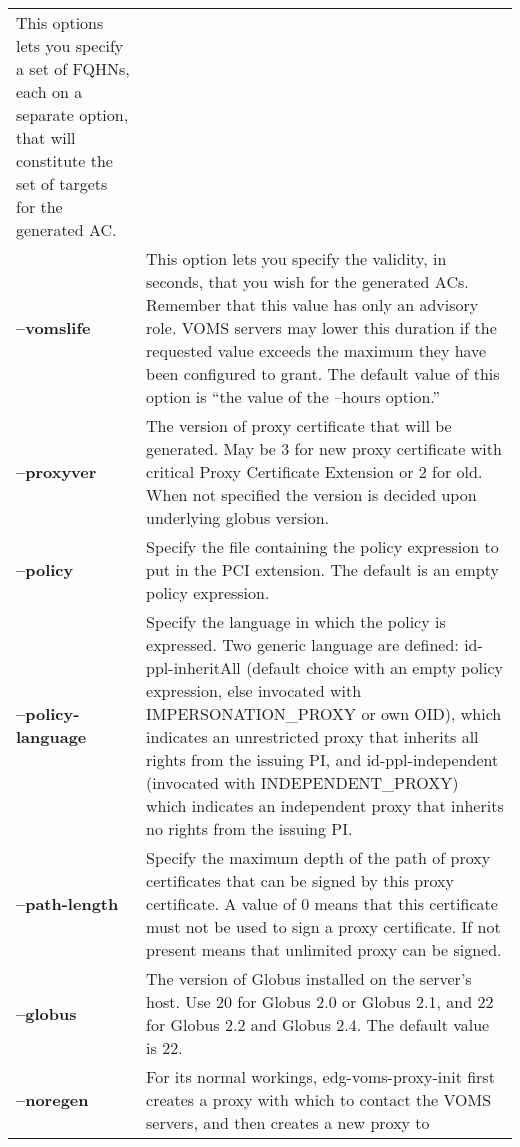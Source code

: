 \documentclass[a4paper]{book}
\begin{document}
\begin{longtable}{lp{3in}}
		      This options lets you specify a set of FQHNs,
		      each on a separate option, that will constitute
		      the set of targets for the generated AC.\\
\textbf{--vomslife} & This option lets you specify the validity, in
		      seconds, that you wish for the generated ACs.
		      Remember that this value has only an advisory
		      role.  VOMS servers may lower this duration if
		      the requested value exceeds the maximum they
		      have been configured to grant.  The default
		      value of this option is ``the value of the
		      --hours option.''\\
\textbf{--proxyver}  & The version of proxy certificate that will be generated.
                       May be 3 for new proxy certificate with critical 
                       Proxy Certificate Extension or 2 for old. When not specified
                       the version is decided upon underlying globus version.\\
\textbf{--policy}    & Specify the file containing the policy expression to put in
                       the PCI extension. The default is an empty policy expression.\\
\textbf{--policy-language} & Specify the language in which the policy is expressed. 
                             Two generic language are defined: id-ppl-inheritAll 
			     (default choice with an empty policy expression,
			     else invocated with IMPERSONATION\_PROXY or own OID), 
			     which indicates an unrestricted proxy that inherits all
			     rights from the issuing PI, and id-ppl-independent
                             (invocated with INDEPENDENT\_PROXY) which indicates an independent proxy that inherits no
			     rights from the issuing PI. \\
\textbf{--path-length}  & Specify the maximum depth of the path of proxy certificates
                          that can be signed by this proxy certificate.
			  A value of 0 means that this certificate must not be used to
			  sign a proxy certificate. If not present means that unlimited proxy can be signed.\\
\textbf{--globus}   & The version of Globus installed on the server's
		      host. Use 20 for Globus 2.0 or Globus 2.1, and
		      22 for Globus 2.2 and Globus 2.4.  The default
		      value is 22.\\  
\textbf{--noregen}  & For its normal workings, edg-voms-proxy-init
		      first creates a proxy with which to contact the
		      VOMS servers, and then creates a new proxy to

\end{longtable}
\end{document}
